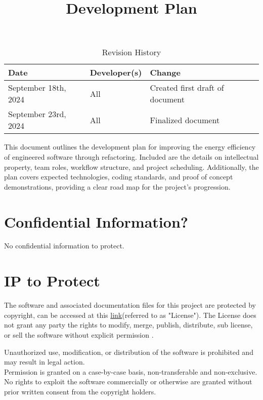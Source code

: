 \documentclass{article}
\title{Development Plan\\ \progname}
\author{\authname}
\date{}
\begin{document}
\maketitle

\begin{table}[hp]
  \caption{Revision History} \label{TblRevisionHistory}
  \begin{tabularx}{\textwidth}{llX}
    \toprule
    \textbf{Date} & \textbf{Developer(s)} & \textbf{Change}\\
    \midrule
    September 18th, 2024 & All & Created first draft of document\\
    September 23rd, 2024 & All & Finalized document\\
    \bottomrule
  \end{tabularx}
\end{table}

\newpage{}

\noindent
This document outlines the development plan for improving the energy
efficiency of
engineered software through refactoring. Included are the details on
intellectual property,
team roles, workflow structure, and project scheduling. Additionally,
the plan covers
expected technologies, coding standards, and proof of concept
demonstrations, providing
a clear road map for the project's progression.

\section{Confidential Information?}

No confidential information to protect.
\section{IP to Protect}

\hspace{\parindent}The software and associated documentation files
for this project are protected by copyright, can be accessed at this
\href{https://github.com/ssm-lab/capstone--source-code-optimizer/blob/main/LICENSE}{
link}(referred to as "License"). The License does not grant any party
the rights to modify, merge, publish, distribute, sub license, or
sell the software without explicit permission .

Unauthorized use, modification, or distribution of the software is
prohibited and may result in legal action.
\\

\hspace{\parindent} Permission is granted on a case-by-case basis,
non-transferable and non-exclusive. No rights to exploit the software
commercially or otherwise are granted without prior written consent
from the copyright holders.
\end{document}
